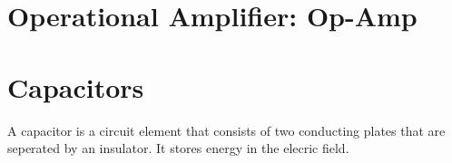 \documentclass{article}
\begin{document}
\section{Operational Amplifier: Op-Amp}


















\section{Capacitors}
\begin{definition}
    A capacitor is a circuit element that consists of two conducting plates that are seperated by an insulator. It stores energy in the elecric field.
\end{definition}
\end{document}
